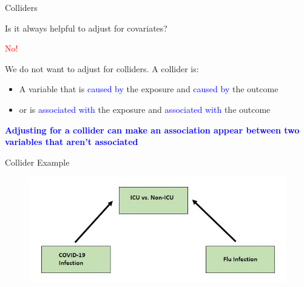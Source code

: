 \documentclass[10pt,t]{beamer}
\begin{document}
\begin{frame}{Colliders}

Is it always helpful to adjust for covariates?\pause

\medskip
\textcolor{red}{No!}

\medskip
We do not want to adjust for colliders. A collider is:
\medskip

\begin{itemize}
	\item A variable that is \textcolor{blue}{caused by} the exposure and \textcolor{blue}{caused by} the outcome
	\medskip
	
	\item or is \textcolor{blue}{associated with} the exposure and \textcolor{blue}{associated with} the outcome 
\end{itemize}
\medskip
\textcolor{blue}{\textbf{Adjusting for a collider can make an association appear between two variables that aren't associated}}

\end{frame}

\begin{frame}{Collider Example}
	
	\begin{figure}
		\centering
	\includegraphics[scale = 0.6]{figures/covidflucollider}
	\end{figure}
\end{frame}
\end{document}
